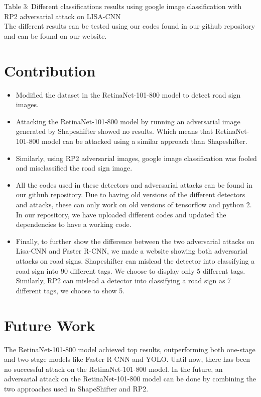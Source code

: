 \documentclass[sigconf, nonacm]{acmart}
\begin{document}
\\
\\Table 3:  Different classifications results using google image classification with RP2 adversarial attack on LISA-CNN
\\
The different results can be tested using our codes found in our github repository and can be found on our website. 
\section{Contribution}
\begin{itemize}
  \item Modified the dataset in the RetinaNet-101-800 model to detect road sign images. 
  \item Attacking the RetinaNet-101-800 model by running an adversarial image generated by Shapeshifter showed no results. Which means that RetinaNet-101-800 model can be attacked using a similar approach than Shapeshifter.
  \item Similarly, using RP2 adversarial images, google image classification was fooled and misclassified the road sign image. 
    \item All the codes used in these detectors and adversarial attacks can be found in our github repository. Due to having old versions of the different detectors and attacks, these can only work on old versions of tensorflow and python 2. In our repository, we have uploaded different codes and updated the dependencies to have a working code.
    \item Finally, to further show the difference between the two adversarial attacks on Lisa-CNN and Faster R-CNN, we made a website showing both adversarial attacks on road signs. Shapeshifter can mislead the detector into classifying a road sign into 90 different tags. We choose to display only 5 different tags. Similarly, RP2 can mislead a detector into classifying a road sign as 7 different tags, we choose to show 5.
\end{itemize}
\section{Future Work}
The RetinaNet-101-800 model achieved top results, outperforming both one-stage and two-stage models like Faster R-CNN and YOLO. Until now, there has been no successful  attack on the RetinaNet-101-800 model. In the future, an adversarial attack on the RetinaNet-101-800 model can be done by combining the two approaches used in ShapeShifter and RP2. 
\end{document}
